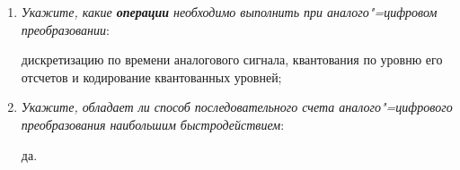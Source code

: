 \documentclass[spec, och, labwork]{shiza}
\begin{document}
\begin{enumerate}
    \item
        \textit{Укажите, какие \textbf{операции} необходимо выполнить при
        аналого"=цифровом преобразовании}:
    
        дискретизацию по времени аналогового сигнала, квантования по уровню его
        отсчетов и кодирование квантованных уровней;

    \item
        \textit{Укажите, обладает ли способ последовательного счета
        аналого"=цифрового преобразования наибольшим быстродействием}:
    
        да.
\end{enumerate}
\end{document}
